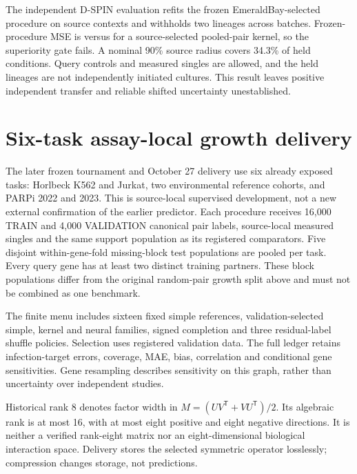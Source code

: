 \documentclass{article}
\begin{document}
The independent D-SPIN evaluation refits the frozen EmeraldBay-selected procedure on source contexts and withholds two lineages across batches. Frozen-procedure MSE is \DspinCandidate{} versus \DspinReference{} for a source-selected pooled-pair kernel, so the superiority gate fails. A nominal 90\% source radius covers 34.3\% of held conditions. Query controls and measured singles are allowed, and the held lineages are not independently initiated cultures. This result leaves positive independent transfer and reliable shifted uncertainty unestablished.




\section{Six-task assay-local growth delivery}
\label{sec:v1-delivery}
The later frozen tournament and October 27 delivery use six already exposed tasks: Horlbeck K562 and Jurkat, two environmental reference cohorts, and PARPi 2022 and 2023. This is source-local supervised development, not a new external confirmation of the earlier predictor. Each procedure receives 16,000 TRAIN and 4,000 VALIDATION canonical pair labels, source-local measured singles and the same support population as its registered comparators. Five disjoint within-gene-fold missing-block test populations are pooled per task. Every query gene has at least two distinct training partners. These block populations differ from the original random-pair growth split above and must not be combined as one benchmark.

The finite menu includes sixteen fixed simple references, validation-selected simple, kernel and neural families, signed completion and three residual-label shuffle policies. Selection uses registered validation data. The full ledger retains infection-target errors, coverage, MAE, bias, correlation and conditional gene sensitivities. Gene resampling describes sensitivity on this graph, rather than uncertainty over independent studies.

Historical rank 8 denotes factor width in $M=(UV^{\mathsf T}+VU^{\mathsf T})/2$. Its algebraic rank is at most 16, with at most eight positive and eight negative directions. It is neither a verified rank-eight matrix nor an eight-dimensional biological interaction space. Delivery stores the selected symmetric operator losslessly; compression changes storage, not predictions.


\end{document}
